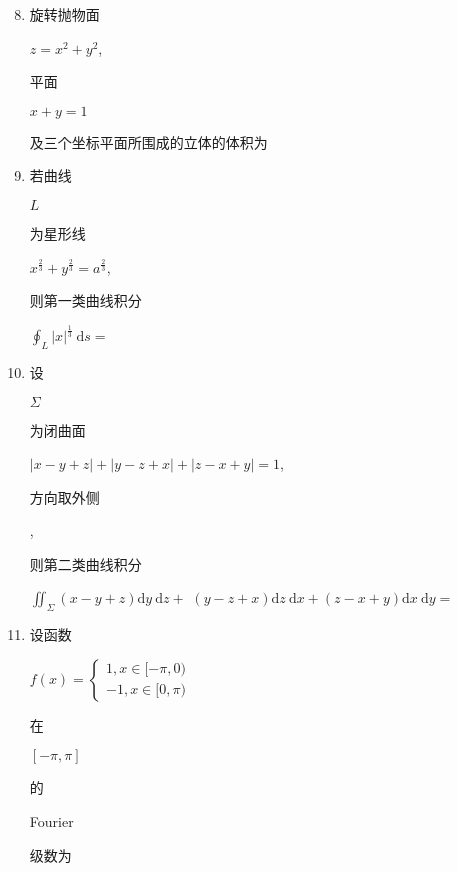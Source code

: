 \documentclass[10pt]{article}
\begin{document}
\begin{enumerate}
  \setcounter{enumi}{7}
  \item \begin{CJK}{UTF8}{mj}旋转抛物面\end{CJK} $z=x^{2}+y^{2}$, \begin{CJK}{UTF8}{mj}平面\end{CJK} $x+y=1$ \begin{CJK}{UTF8}{mj}及三个坐标平面所围成的立体的体积为\end{CJK}

  \item \begin{CJK}{UTF8}{mj}若曲线\end{CJK} $L$ \begin{CJK}{UTF8}{mj}为星形线\end{CJK} $x^{\frac{2}{3}}+y^{\frac{2}{3}}=a^{\frac{2}{3}}$, \begin{CJK}{UTF8}{mj}则第一类曲线积分\end{CJK} $\oint_{L}|x|^{\frac{1}{3}} \mathrm{~d} s=$

  \item \begin{CJK}{UTF8}{mj}设\end{CJK} $\Sigma$ \begin{CJK}{UTF8}{mj}为闭曲面\end{CJK} $|x-y+z|+|y-z+x|+|z-x+y|=1$, \begin{CJK}{UTF8}{mj}方向取外侧\end{CJK}, \begin{CJK}{UTF8}{mj}则第二类曲线积分\end{CJK} $\iint_{\Sigma}(x-y+z) \mathrm{d} y \mathrm{~d} z+$ $(y-z+x) \mathrm{d} z \mathrm{~d} x+(z-x+y) \mathrm{d} x \mathrm{~d} y=$

  \item \begin{CJK}{UTF8}{mj}设函数\end{CJK} $f(x)=\left\{\begin{array}{l}1, x \in[-\pi, 0) \\ -1, x \in[0, \pi)\end{array}\right.$ \begin{CJK}{UTF8}{mj}在\end{CJK} $[-\pi, \pi]$ \begin{CJK}{UTF8}{mj}的\end{CJK} Fourier \begin{CJK}{UTF8}{mj}级数为\end{CJK}

\end{enumerate}
\end{document}
